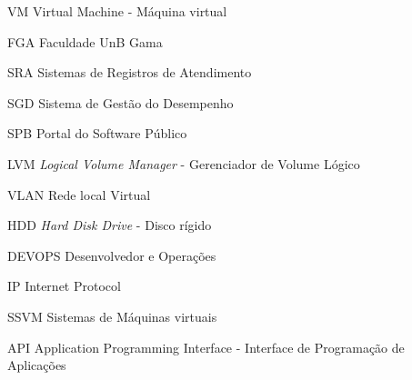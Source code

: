 \begin{siglas}
  \item[VM] Virtual Machine - Máquina virtual
  \item[FGA] Faculdade UnB Gama
  \item[SRA] Sistemas de Registros de Atendimento
  \item[SGD] Sistema de Gestão do Desempenho
  \item[SPB] Portal do Software Público
  \item[LVM] \textit{Logical Volume Manager} - Gerenciador de Volume Lógico
  \item[VLAN] Rede local Virtual
  \item[HDD] \textit{Hard Disk Drive} - Disco rígido
  \item[DEVOPS] Desenvolvedor e Operações
  \item[IP] Internet Protocol
  \item [SSVM] Sistemas de Máquinas virtuais
  \item [API] Application Programming Interface - Interface de Programação de Aplicações 
\end{siglas}
